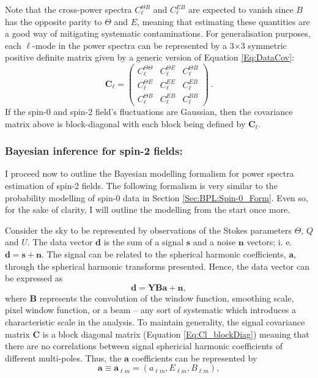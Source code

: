 \qquad Note that the cross-power spectra $ C_{\ell}^{\Theta B}$ and $C_{\ell}^{EB}$ are expected to vanish since $B$ has the opposite parity to $\Theta$ and $E$, meaning that estimating these quantities are a good way of mitigating systematic contaminations. For generalisation purposes, each $\ell$-mode in the power spectra can be represented by a 3$\times$3 symmetric positive definite matrix given by a generic version of Equation \eqref{Eq:DataCov}:
\begin{equation}
\mathbf{C}_{\ell}=\left(
\begin{array}{ccc}
C_{\ell}^{\Theta\Theta} & C_{\ell}^{\Theta E} &  C_{\ell}^{\Theta B}\\
C_{\ell}^{\Theta E} & C_{\ell}^{EE} & C_{\ell}^{E B} \\
C_{\ell}^{\Theta B} & C_{\ell}^{E B} & C_{\ell}^{BB}
\end{array} \right)\, .
\label{Eq:Cl_blockDiag}
\end{equation}
\noindent If the spin-0 and spin-2 field's fluctuations are Gaussian, then the covariance matrix above is block-diagonal with each block being defined by $\mathbf{C}_{\ell}$. 

\subsubsection{Bayesian inference for spin-2 fields:}
I proceed now to outline the Bayesian modelling formalism for power spectra estimation of spin-2 fields. The following formalism is very similar to the probability modelling of spin-0 data in Section %
\ref{Sec:BPL:Spin-0_Form}. Even so, for the sake of clarity, I will outline the modelling from the start once more. 

\qquad Consider the sky to be represented by observations of the Stokes parameters $\Theta,\, Q$ and $U$. The data vector $\mathbf{d}$ is the sum of a signal $\mathbf{s}$ and a noise $\mathbf{n}$ vectors; i. e. $\mathbf{d}=\mathbf{s}+\mathbf{n}$.  The signal can be related to the spherical harmonic coefficients, $\mathbf{a}$, through the spherical harmonic transforms presented. Hence, the data vector can be expressed as
\begin{equation}
\mathbf{d}=\mathbf{YBa}+\mathbf{n},
\end{equation}
\noindent where $\mathbf{B}$ represents the convolution of the window function, smoothing scale, pixel window function, or a beam -- any sort of systematic which introduces a characteristic scale in the analysis. To maintain generality, the signal covariance matrix $\mathbf{C}$ is a block diagonal matrix (Equation \ref{Eq:Cl_blockDiag}) meaning that there are no correlations between signal sphericial harmonic coefficients of different multi-poles. Thus, the $\bm{a}$ coefficients can be represented by
\begin{equation}
\mathbf{a} \equiv \mathbf{a}_{\ell m}=\left( a_{\ell m},E_{\ell m},B_{\ell m}\right),
\end{equation}

